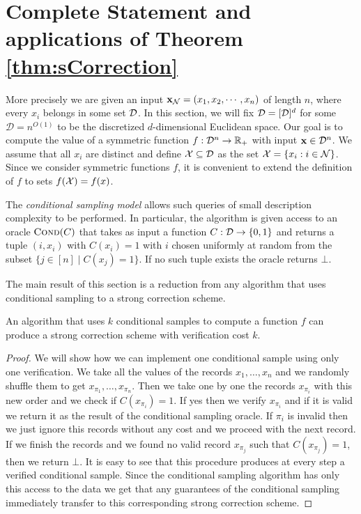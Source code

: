 \section{Complete Statement and applications of Theorem \ref{thm:sCorrection}} \label{sec:app:applicationsStrongCorrection}

  More precisely we are given an input $\mathbf{x}_{\mathcal{N}} = (x_1, x_2 , \cdots , x_n)$ of length $n$, where every $x_i$ belongs in some set 
$\mathcal{D}$. In this section, we will fix $\mathcal{D} = [\mathcal{D}]^d$ for some $\mathcal{D} = n^{O(1)}$ to be the discretized 
$d$-dimensional Euclidean space. Our goal is to compute the value of a symmetric function 
$f : \mathcal{D}^n \rightarrow \mathbb{R}_+$ with input $\mathbf x \in \mathcal{D}^n$. We assume that all $x_i$ are distinct and define 
$\mathcal{X} \subseteq \mathcal{D}$ as the set $\mathcal{X} = \{x_i : i \in \mathcal{N}\}$. Since we consider symmetric functions $f$, it 
is convenient to extend the definition of $f$ to sets $f(\mathcal{X}) = f(x)$.

  The \emph{conditional sampling model} allows such queries of small description complexity to be performed. In particular, 
the algorithm is given access to an oracle $\textsc{Cond}(C)$ that takes as input a function $C: \mathcal{D} \rightarrow \{0,1\}$ and 
returns a tuple $(i, x_i)$ with $C(x_i) = 1$ with $i$ chosen uniformly at random from the subset 
$\{ j \in [n] \mid C(x_j) = 1 \}$. If no such tuple exists the oracle returns $\bot$.

  The main result of this section is a reduction from any algorithm that uses conditional sampling to a strong correction
scheme.

\begin{theorem}
    An algorithm that uses $k$ conditional samples to compute a function $f$ can produce a strong correction scheme with 
  verification cost $k$.
\end{theorem}

\begin{proof}
    We will show how we can implement one conditional sample using only one verification. We take all the values of the
  records $x_1, \dots, x_n$ and we randomly shuffle them to get $x_{\pi_1}, \dots, x_{\pi_n}$. Then we take one by one 
  the records $x_{\pi_i}$ with this new order and we check if $C(x_{\pi_i}) = 1$. If yes then we verify $x_{\pi_i}$ and
  if it is valid we return it as the result of the conditional sampling oracle. If $\pi_i$ is invalid then we just ignore
  this records without any cost and we proceed with the next record. If we finish the records and we found no valid record 
  $x_{\pi_j}$ such that $C(x_{\pi_j}) = 1$, then we return $\bot$. It is easy to see that this procedure produces at every 
  step a verified conditional sample. Since the conditional sampling algorithm has only this access to the data we get that
  any guarantees of the conditional sampling immediately transfer to this corresponding strong correction scheme.
\end{proof}

